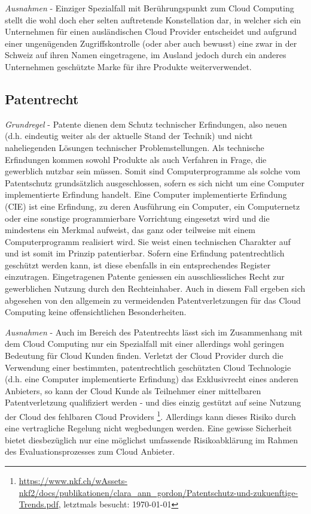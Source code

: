 \documentclass[a4paper,pointlessnumbers]{scrreprt}
\begin{document}
\textit{Ausnahmen} - Einziger Spezialfall mit Berührungspunkt zum Cloud Computing stellt die wohl doch eher selten auftretende Konstellation dar, in welcher sich ein Unternehmen für einen ausländischen Cloud Provider entscheidet und aufgrund einer ungenügenden Zugriffskontrolle (oder aber auch bewusst) eine zwar in der Schweiz auf ihren Namen eingetragene, im Ausland jedoch durch ein anderes Unternehmen geschützte Marke für ihre Produkte weiterverwendet.

\subsection{Patentrecht}
\textit{Grundregel} - Patente dienen dem Schutz technischer Erfindungen, also neuen (d.h. eindeutig weiter als der aktuelle Stand der Technik) und nicht naheliegenden Lösungen technischer Problemstellungen. Als technische Erfindungen kommen sowohl Produkte als auch Verfahren in Frage, die gewerblich nutzbar sein müssen. Somit sind Computerprogramme als solche vom Patentschutz grundsätzlich ausgeschlossen, sofern es sich nicht um eine Computer implementierte Erfindung handelt. Eine Computer implementierte Erfindung (CIE) ist eine Erfindung, zu deren Ausführung ein Computer, ein Computernetz oder eine sonstige programmierbare Vorrichtung eingesetzt wird und die mindestens ein Merkmal aufweist, das ganz oder teilweise mit einem Computerprogramm realisiert wird. Sie weist einen technischen Charakter auf und ist somit im Prinzip patentierbar. Sofern eine Erfindung patentrechtlich geschützt werden kann, ist diese ebenfalls in ein entsprechendes Register einzutragen. Eingetragenen Patente geniessen ein ausschliessliches Recht zur gewerblichen Nutzung durch den Rechteinhaber. Auch in diesem Fall ergeben sich abgesehen von den allgemein zu vermeidenden Patentverletzungen für das Cloud Computing keine offensichtlichen Besonderheiten.

\textit{Ausnahmen} - Auch im Bereich des Patentrechts lässt sich im Zusammenhang mit dem Cloud Computing nur ein Spezialfall mit einer allerdings wohl geringen Bedeutung für Cloud Kunden finden. Verletzt der Cloud Provider durch die Verwendung einer bestimmten, patentrechtlich geschützten Cloud Technologie (d.h. eine Computer implementierte Erfindung) das Exklusivrecht eines anderen Anbieters, so kann der Cloud Kunde als Teilnehmer einer mittelbaren Patentverletzung qualifiziert werden - und dies einzig gestützt auf seine Nutzung der Cloud des fehlbaren Cloud Providers \footnote{\href{https://www.nkf.ch/wAssets-nkf2/docs/publikationen/clara\_ann\_gordon/Patentschutz-und-zukuenftige-Trends.pdf}{https://www.nkf.ch/wAssets-nkf2/docs/publikationen/clara\_ann\_gordon/Patentschutz-und-zukuenftige-Trends.pdf}, letztmals besucht: \today}. Allerdings kann dieses Risiko durch eine vertragliche Regelung nicht wegbedungen werden. Eine gewisse Sicherheit bietet diesbezüglich nur eine möglichst umfassende Risikoabklärung im Rahmen des Evaluationsprozesses zum Cloud Anbieter.
\end{document}
